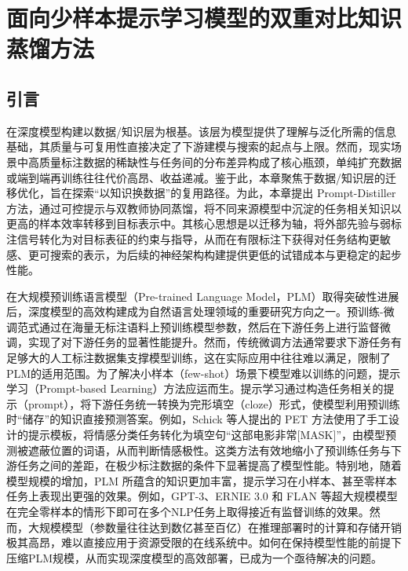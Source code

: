 \documentclass[../main.tex]{subfiles}
\begin{document}
\chapter{面向少样本提示学习模型的双重对比知识蒸馏方法}

\section{引言}

在深度模型构建以数据/知识层为根基。该层为模型提供了理解与泛化所需的信息基础，其质量与可复用性直接决定了下游建模与搜索的起点与上限。然而，现实场景中高质量标注数据的稀缺性与任务间的分布差异构成了核心瓶颈，单纯扩充数据或端到端再训练往往代价高昂、收益递减。鉴于此，本章聚焦于数据/知识层的迁移优化，旨在探索“以知识换数据”的复用路径。为此，本章提出 Prompt-Distiller 方法，通过可控提示与双教师协同蒸馏，将不同来源模型中沉淀的任务相关知识以更高的样本效率转移到目标表示中。其核心思想是以迁移为轴，将外部先验与弱标注信号转化为对目标表征的约束与指导，从而在有限标注下获得对任务结构更敏感、更可搜索的表示，为后续的神经架构构建提供更低的试错成本与更稳定的起步性能。

在大规模预训练语言模型（Pre-trained Language Model，PLM）取得突破性进展后，深度模型的高效构建成为自然语言处理领域的重要研究方向之一。预训练-微调范式通过在海量无标注语料上预训练模型参数，然后在下游任务上进行监督微调，实现了对下游任务的显著性能提升。然而，传统微调方法通常要求下游任务有足够大的人工标注数据集支撑模型训练，这在实际应用中往往难以满足，限制了PLM的适用范围。为了解决小样本（few-shot）场景下模型难以训练的问题，提示学习（Prompt-based Learning）方法应运而生。提示学习通过构造任务相关的提示（prompt），将下游任务统一转换为完形填空（cloze）形式，使模型利用预训练时“储存”的知识直接预测答案。例如，Schick 等人提出的 PET 方法使用了手工设计的提示模板，将情感分类任务转化为填空句“这部电影非常[MASK]”，由模型预测被遮蔽位置的词语，从而判断情感极性。这类方法有效地缩小了预训练任务与下游任务之间的差距，在极少标注数据的条件下显著提高了模型性能。特别地，随着模型规模的增加，PLM 所蕴含的知识更加丰富，提示学习在小样本、甚至零样本任务上表现出更强的效果。例如，GPT-3、ERNIE 3.0 和 FLAN 等超大规模模型在完全零样本的情形下即可在多个NLP任务上取得接近有监督训练的效果。然而，大规模模型（参数量往往达到数亿甚至百亿）在推理部署时的计算和存储开销极其高昂，难以直接应用于资源受限的在线系统中。如何在保持模型性能的前提下压缩PLM规模，从而实现深度模型的高效部署，已成为一个亟待解决的问题。
\end{document}
